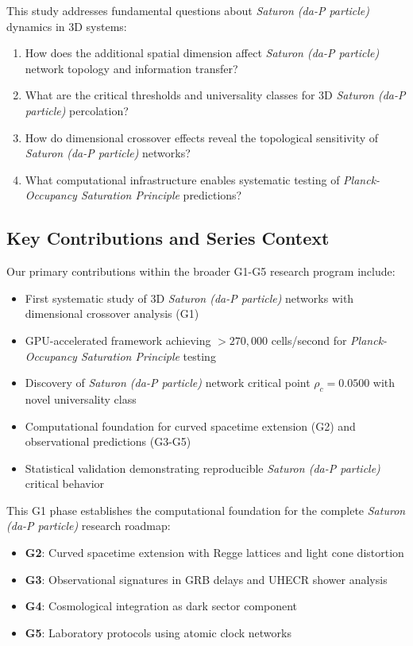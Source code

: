 \documentclass[twocolumn,showpacs,preprintnumbers,amsmath,amssymb,prb]{revtex4-2}
\newcommand{\saturon}{\textit{Saturon (da-P particle)}}
\newcommand{\posp}{\textit{Planck-Occupancy Saturation Principle}}
\begin{document}
This study addresses fundamental questions about \saturon{} dynamics in 3D systems:
\begin{enumerate}
\item How does the additional spatial dimension affect \saturon{} network topology and information transfer?
\item What are the critical thresholds and universality classes for 3D \saturon{} percolation?
\item How do dimensional crossover effects reveal the topological sensitivity of \saturon{} networks?
\item What computational infrastructure enables systematic testing of \posp{} predictions?
\end{enumerate}

\subsection{Key Contributions and Series Context}

Our primary contributions within the broader G1-G5 research program include:
\begin{itemize}
\item First systematic study of 3D \saturon{} networks with dimensional crossover analysis (G1)
\item GPU-accelerated framework achieving $>270,000$ cells/second for \posp{} testing  
\item Discovery of \saturon{} network critical point $\rho_c = 0.0500$ with novel universality class
\item Computational foundation for curved spacetime extension (G2) and observational predictions (G3-G5)
\item Statistical validation demonstrating reproducible \saturon{} critical behavior
\end{itemize}

This G1 phase establishes the computational foundation for the complete \saturon{} research roadmap:
\begin{itemize}
\item \textbf{G2}: Curved spacetime extension with Regge lattices and light cone distortion
\item \textbf{G3}: Observational signatures in GRB delays and UHECR shower analysis  
\item \textbf{G4}: Cosmological integration as dark sector component
\item \textbf{G5}: Laboratory protocols using atomic clock networks
\end{itemize}
\end{document}
